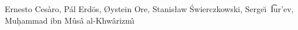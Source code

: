 Ernesto Ces\`aro, P\'al Erd\"os, \O ystein Ore, Stanis\l aw \'Swierczkowski, Serge\u\i\ \t{Iu}r'ev, Mu\d hammad ibn M\^us\^a al-Khw\^arizm\^\i
